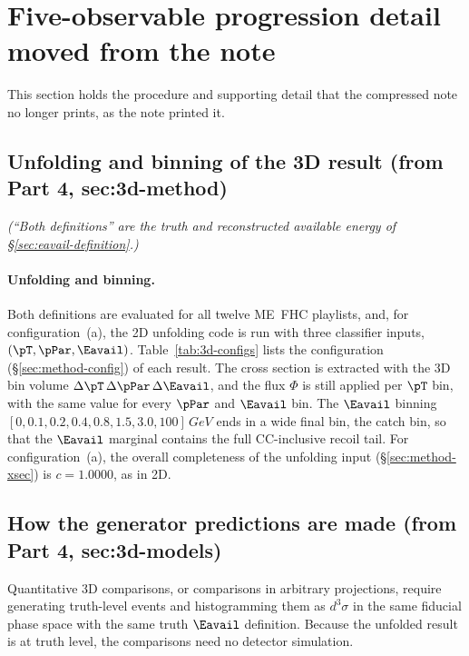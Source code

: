 \section{Five-observable progression detail moved from the note}
This section holds the procedure and supporting detail that the compressed note no longer prints, as the note printed it.

\subsection{Unfolding and binning of the 3D result (from Part 4, sec:3d-method)}
\noindent\emph{(``Both definitions'' are the truth and reconstructed available energy of \S\ref{sec:eavail-definition}.)}
\paragraph{Unfolding and binning.} Both definitions are evaluated for all twelve ME~FHC playlists, and, for configuration~(a), the 2D unfolding code is run with three classifier inputs, $(\pT,\pPar,\Eavail)$. Table~\ref{tab:3d-configs} lists the configuration (\S\ref{sec:method-config}) of each result. The cross section is extracted with the 3D bin volume $\Delta\pT\,\Delta\pPar\,\Delta\Eavail$, and the flux $\Phi$ is still applied per $\pT$ bin, with the same value for every $\pPar$ and $\Eavail$ bin. The $\Eavail$ binning $[0,0.1,0.2,0.4,0.8,1.5,3.0,100]\,\si{GeV}$ ends in a wide final bin, the catch bin, so that the $\Eavail$ marginal contains the full CC-inclusive recoil tail. For configuration~(a), the overall completeness of the unfolding input (\S\ref{sec:method-xsec}) is $c=1.0000$, as in 2D.

\subsection{How the generator predictions are made (from Part 4, sec:3d-models)}
Quantitative 3D comparisons, or comparisons in arbitrary projections, require generating truth-level events and histogramming them as $d^{3}\sigma$ in the same fiducial phase space with the same truth $\Eavail$ definition. Because the unfolded result is at truth level, the comparisons need no detector simulation.

